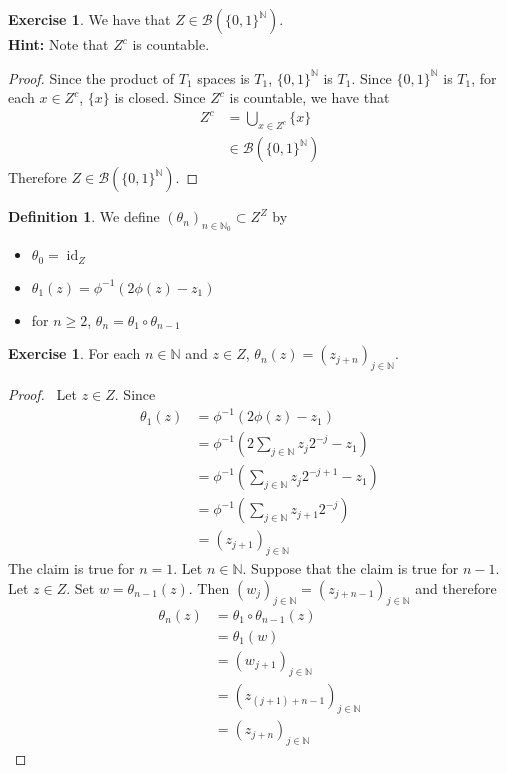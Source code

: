 \documentclass{book}
\theoremstyle{definition}
\newtheorem{defn}[definition]{Definition}
\newtheorem{ex}[definition]{Exercise}
\newcommand{\N}{\mathbb{N}}
\newcommand{\MB}{\mathcal{B}}
\newcommand{\lex}[1]{\label{ex:#1}}
\DeclareMathOperator{\id}{id}
\DeclareMathOperator*{\0}{\mbf{0}}
\DeclareMathOperator*{\1}{\mbf{1}}
\begin{document}
	\begin{ex} \lex{28003} 
		We have that $Z \in \MB(\{0,1\}^{\N})$. \\
		\textbf{Hint:} Note that $Z^c$ is countable. 
	\end{ex}
	
	\begin{proof}
		Since the product of $T_1$ spaces is $T_1$, $\{0,1\}^{\N}$ is $T_1$. Since $\{0,1\}^{\N}$ is $T_1$, for each $x \in Z^c$, $\{x \}$ is closed. Since $Z^c$ is countable, we have that 
		\begin{align*}
			Z^c
			& = \bigcup_{x \in  Z^c} \{x\} \\
			& \in  \MB(\{0,1\}^{\N})
		\end{align*} 
		Therefore $Z \in  \MB(\{0,1\}^{\N})$.
	\end{proof}
	
	\begin{defn} \lex{28004} 
		We define $(\theta_n)_{n \in \N_0} \subset Z^Z$ by
		\begin{itemize}
			\item 	$\theta_0 = \id_Z$
			\item $\theta_1 (z) = \phi^{-1}(2 \phi(z) - z_1)$ 
			\item for $n \geq 2$, $\theta_n = \theta_1 \circ \theta_{n-1}$
		\end{itemize}
	\end{defn}
	
	\begin{ex} \lex{28005} 
		For each $n \in \N$ and $z \in Z$, $\theta_n(z) = (z_{j+n})_{j \in \N}$.
	\end{ex}
	
	\begin{proof} \
		Let $z \in Z$. Since  
		\begin{align*}
			\theta_1(z) 
			& = \phi^{-1}(2 \phi(z) - z_1) \\
			& = \phi^{-1}(2 \sum_{j \in \N} z_j2^{-j} - z_1) \\
			& = \phi^{-1}(\sum_{j \in \N} z_j2^{-j+1} - z_1) \\
			& = \phi^{-1}(\sum_{j \in \N} z_{j+1}2^{-j}) \\
			& = (z_{j+1})_{j \in \N}
		\end{align*}
		The claim is true for $n =1$. Let $n \in \N$. Suppose that the claim is true for $n-1$. Let $z \in Z$. Set $w = \theta_{n-1}(z)$. Then $(w_{j})_{j \in \N} = (z_{j+n -1})_{j \in \N}$ and therefore
		\begin{align*}
			\theta_n(z) 
			& = \theta_1 \circ \theta_{n-1} (z) \\
			& = \theta_1 (w) \\
			& = (w_{j + 1})_{j \in \N} \\
			& = (z_{(j+ 1) +  n-1} )_{j \in \N} \\
			& = (z_{j+  n })_{j \in \N}
		\end{align*}
	\end{proof}
	
\end{document}
